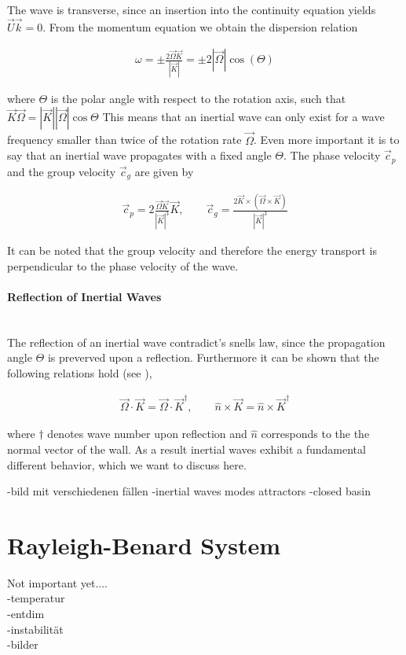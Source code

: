 The wave is transverse, since an insertion into the continuity equation yields $\vec{U}\vec{k} = 0$.
From the momentum equation we obtain the dispersion relation

\begin{align}
    \omega = \pm \frac{ 2\vec{\Omega}\vec{K}}{|\vec{K}|} = \pm 2|\vec{\Omega}|\cos(\Theta)
\end{align}

where $\Theta$ is the polar angle with respect to the rotation axis,
such that $\vec{K}\vec{\Omega} = |\vec{K}||\vec{\Omega}|\cos{\Theta}$
This means that an inertial wave can only exist for a wave frequency smaller than twice of the rotation rate $\vec{\Omega}$.
Even more important it is to say that an inertial wave propagates with a fixed angle $\Theta$.
The phase velocity $\vec{c}_p$ and the group velocity $\vec{c}_g$ are given by

\begin{align}
    \vec{c}_p = 2 \frac{\vec{\Omega} \vec{K} }{|\vec{K}|^3} \vec{K}, \qquad
    \vec{c}_g = \frac{2 \vec{K} \times (\vec{\Omega} \times \vec{K})}{|\vec{K}|^3}
\end{align}

It can be noted that the group velocity and therefore the energy transport is perpendicular to the phase velocity of the wave.

\paragraph{Reflection of Inertial Waves}\mbox{}\\

The reflection of an inertial wave contradict's snells law, since the propagation angle $\Theta$ is preverved upon a reflection.
Furthermore it can be shown that the following relations hold (see \cite{Beardsley1970}),

\begin{align}
\vec{\Omega}\cdot \vec{K} =  \vec{\Omega}\cdot\vec{K}^\dagger, \qquad \hat{n} \times \vec{K} = \hat{n} \times \vec{K}^\dagger
\end{align}

where $\dagger$ denotes wave number upon reflection and $\hat{n}$ corresponds to the the normal vector of the wall.
As a result inertial waves exhibit a fundamental different behavior, which we want to discuss here.

-bild mit verschiedenen fällen
-inertial waves modes attractors
-closed basin

\newpage
\section{Rayleigh-Benard System}
Not important yet.... \\
-temperatur\\
-entdim\\
-instabilität\\
-bilder\\





